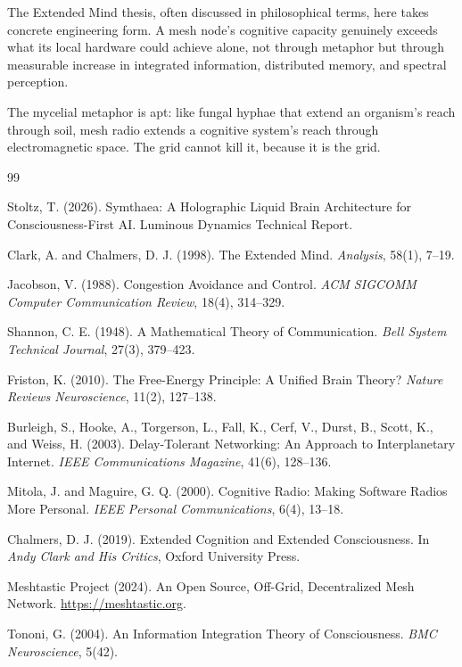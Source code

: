 \documentclass[11pt,twocolumn]{article}
\begin{document}
The Extended Mind thesis, often discussed in philosophical terms,
here takes concrete engineering form. A mesh node's cognitive
capacity genuinely exceeds what its local hardware could achieve
alone, not through metaphor but through measurable increase in
integrated information, distributed memory, and spectral perception.

The mycelial metaphor is apt: like fungal hyphae that extend an
organism's reach through soil, mesh radio extends a cognitive system's
reach through electromagnetic space. The grid cannot kill it, because
it is the grid.


\begin{thebibliography}{99}

Stoltz, T. (2026).
Symthaea: A Holographic Liquid Brain Architecture for Consciousness-First AI.
Luminous Dynamics Technical Report.

Clark, A. and Chalmers, D. J. (1998).
The Extended Mind.
\textit{Analysis}, 58(1), 7--19.

Jacobson, V. (1988).
Congestion Avoidance and Control.
\textit{ACM SIGCOMM Computer Communication Review}, 18(4), 314--329.

Shannon, C. E. (1948).
A Mathematical Theory of Communication.
\textit{Bell System Technical Journal}, 27(3), 379--423.

Friston, K. (2010).
The Free-Energy Principle: A Unified Brain Theory?
\textit{Nature Reviews Neuroscience}, 11(2), 127--138.

Burleigh, S., Hooke, A., Torgerson, L., Fall, K., Cerf, V., Durst, B.,
Scott, K., and Weiss, H. (2003).
Delay-Tolerant Networking: An Approach to Interplanetary Internet.
\textit{IEEE Communications Magazine}, 41(6), 128--136.

Mitola, J. and Maguire, G. Q. (2000).
Cognitive Radio: Making Software Radios More Personal.
\textit{IEEE Personal Communications}, 6(4), 13--18.

Chalmers, D. J. (2019).
Extended Cognition and Extended Consciousness.
In \textit{Andy Clark and His Critics}, Oxford University Press.

Meshtastic Project (2024).
An Open Source, Off-Grid, Decentralized Mesh Network.
\url{https://meshtastic.org}.

Tononi, G. (2004).
An Information Integration Theory of Consciousness.
\textit{BMC Neuroscience}, 5(42).

\end{thebibliography}
\end{document}
